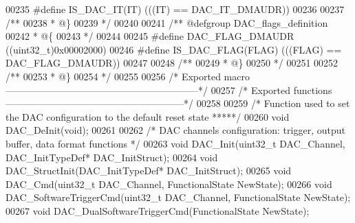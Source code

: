 \begin{DoxyCode}
00235 \textcolor{preprocessor}{#}\textcolor{preprocessor}{define} \textcolor{preprocessor}{IS\_DAC\_IT}\textcolor{preprocessor}{(}\textcolor{preprocessor}{IT}\textcolor{preprocessor}{)} \textcolor{preprocessor}{(}\textcolor{preprocessor}{(}\textcolor{preprocessor}{(}\textcolor{preprocessor}{IT}\textcolor{preprocessor}{)} \textcolor{preprocessor}{==} DAC_IT_DMAUDR\textcolor{preprocessor}{)}\textcolor{preprocessor}{)}
00236 
00237 \textcolor{comment}{/**}
00238 \textcolor{comment}{  * @\}}
00239 \textcolor{comment}{  */}
00240 
00241 \textcolor{comment}{/** @defgroup DAC\_flags\_definition }
00242 \textcolor{comment}{  * @\{}
00243 \textcolor{comment}{  */}
00244 
00245 \textcolor{preprocessor}{#}\textcolor{preprocessor}{define} \textcolor{preprocessor}{DAC\_FLAG\_DMAUDR}                    \textcolor{preprocessor}{(}\textcolor{preprocessor}{(}\textcolor{preprocessor}{uint32\_t}\textcolor{preprocessor}{)}0x00002000\textcolor{preprocessor}{)}
00246 \textcolor{preprocessor}{#}\textcolor{preprocessor}{define} \textcolor{preprocessor}{IS\_DAC\_FLAG}\textcolor{preprocessor}{(}\textcolor{preprocessor}{FLAG}\textcolor{preprocessor}{)} \textcolor{preprocessor}{(}\textcolor{preprocessor}{(}\textcolor{preprocessor}{(}\textcolor{preprocessor}{FLAG}\textcolor{preprocessor}{)} \textcolor{preprocessor}{==} DAC_FLAG_DMAUDR\textcolor{preprocessor}{)}\textcolor{preprocessor}{)}
00247 
00248 \textcolor{comment}{/**}
00249 \textcolor{comment}{  * @\}}
00250 \textcolor{comment}{  */}
00251 
00252 \textcolor{comment}{/**}
00253 \textcolor{comment}{  * @\}}
00254 \textcolor{comment}{  */}
00255 
00256 \textcolor{comment}{/* Exported macro ------------------------------------------------------------*/}
00257 \textcolor{comment}{/* Exported functions --------------------------------------------------------*/}
00258 
00259 \textcolor{comment}{/*  Function used to set the DAC configuration to the default reset state *****/}
00260 \textcolor{keywordtype}{void} DAC_DeInit(\textcolor{keywordtype}{void});
00261 
00262 \textcolor{comment}{/*  DAC channels configuration: trigger, output buffer, data format functions */}
00263 \textcolor{keywordtype}{void} DAC_Init(uint32\_t DAC\_Channel, DAC\_InitTypeDef* DAC\_InitStruct);
00264 \textcolor{keywordtype}{void} DAC_StructInit(DAC\_InitTypeDef* DAC\_InitStruct);
00265 \textcolor{keywordtype}{void} DAC_Cmd(uint32\_t DAC\_Channel, FunctionalState NewState);
00266 \textcolor{keywordtype}{void} DAC_SoftwareTriggerCmd(uint32\_t DAC\_Channel, FunctionalState NewState);
00267 \textcolor{keywordtype}{void} DAC_DualSoftwareTriggerCmd(FunctionalState NewState);

\end{DoxyCode}

